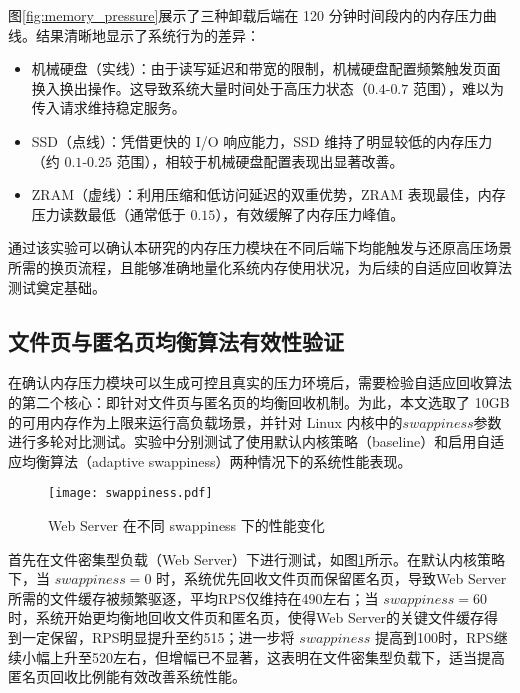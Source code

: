 图\ref{fig:memory_pressure}展示了三种卸载后端在 120 分钟时间段内的内存压力曲线。结果清晰地显示了系统行为的差异：
\begin{itemize}
    \item 机械硬盘（实线）：由于读写延迟和带宽的限制，机械硬盘配置频繁触发页面换入换出操作。这导致系统大量时间处于高压力状态（$0.4$-$0.7$ 范围），难以为传入请求维持稳定服务。
    \item SSD（点线）：凭借更快的 I/O 响应能力，SSD 维持了明显较低的内存压力（约 $0.1$-$0.25$ 范围），相较于机械硬盘配置表现出显著改善。
    \item ZRAM（虚线）：利用压缩和低访问延迟的双重优势，ZRAM 表现最佳，内存压力读数最低（通常低于 $0.15$），有效缓解了内存压力峰值。
\end{itemize}

通过该实验可以确认本研究的内存压力模块在不同后端下均能触发与还原高压场景所需的换页流程，且能够准确地量化系统内存使用状况，为后续的自适应回收算法测试奠定基础。


\subsection{文件页与匿名页均衡算法有效性验证}
\label{sec:file_page_anonymous_page_balance_algorithm_validation}

在确认内存压力模块可以生成可控且真实的压力环境后，需要检验自适应回收算法的第二个核心：即针对文件页与匿名页的均衡回收机制。为此，本文选取了 10GB 的可用内存作为上限来运行高负载场景，并针对 Linux 内核中的\(swappiness\)参数进行多轮对比测试。实验中分别测试了使用默认内核策略（baseline）和启用自适应均衡算法（adaptive swappiness）两种情况下的系统性能表现。

\begin{figure}[htbp]
    \centering
    \texttt{[image: swappiness.pdf]}
    \caption{Web Server 在不同  swappiness  下的性能变化}
    \label{fig:web_server_swappiness}
\end{figure}

首先在文件密集型负载（Web Server）下进行测试，如图\ref{fig:web_server_swappiness}所示。在默认内核策略下，当 \(swappiness=0\) 时，系统优先回收文件页而保留匿名页，导致Web Server所需的文件缓存被频繁驱逐，平均RPS仅维持在490左右；当 \(swappiness=60\) 时，系统开始更均衡地回收文件页和匿名页，使得Web Server的关键文件缓存得到一定保留，RPS明显提升至约515；进一步将 \(swappiness\) 提高到100时，RPS继续小幅上升至520左右，但增幅已不显著，这表明在文件密集型负载下，适当提高匿名页回收比例能有效改善系统性能。


